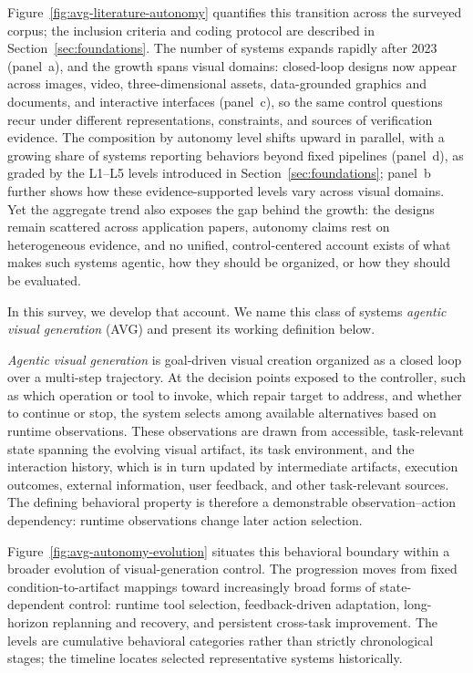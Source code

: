 Figure~\ref{fig:avg-literature-autonomy} quantifies this transition across the surveyed corpus; the inclusion criteria and coding protocol are described in Section~\ref{sec:foundations}. The number of systems expands rapidly after 2023 (panel~a), and the growth spans visual domains: closed-loop designs now appear across images, video, three-dimensional assets, data-grounded graphics and documents, and interactive interfaces (panel~c), so the same control questions recur under different representations, constraints, and sources of verification evidence. The composition by autonomy level shifts upward in parallel, with a growing share of systems reporting behaviors beyond fixed pipelines (panel~d), as graded by the L1--L5 levels introduced in Section~\ref{sec:foundations}; panel~b further shows how these evidence-supported levels vary across visual domains. Yet the aggregate trend also exposes the gap behind the growth: the designs remain scattered across application papers, autonomy claims rest on heterogeneous evidence, and no unified, control-centered account exists of what makes such systems agentic, how they should be organized, or how they should be evaluated.

In this survey, we develop that account. We name this class of systems \emph{agentic visual generation} (AVG) and present its working definition below.

\begin{keytakeawaytight}
\emph{Agentic visual generation} is goal-driven visual creation organized as a closed loop over a multi-step trajectory. At the decision points exposed to the controller, such as which operation or tool to invoke, which repair target to address, and whether to continue or stop, the system selects among available alternatives based on runtime observations. These observations are drawn from accessible, task-relevant state spanning the evolving visual artifact, its task environment, and the interaction history, which is in turn updated by intermediate artifacts, execution outcomes, external information, user feedback, and other task-relevant sources. The defining behavioral property is therefore a demonstrable observation--action dependency: runtime observations change later action selection.
\end{keytakeawaytight}

Figure~\ref{fig:avg-autonomy-evolution} situates this behavioral boundary
within a broader evolution of visual-generation control. The progression
moves from fixed condition-to-artifact mappings toward increasingly broad
forms of state-dependent control: runtime tool selection, feedback-driven
adaptation, long-horizon replanning and recovery, and persistent
cross-task improvement. The levels are cumulative behavioral categories
rather than strictly chronological stages; the timeline locates selected
representative systems historically.

